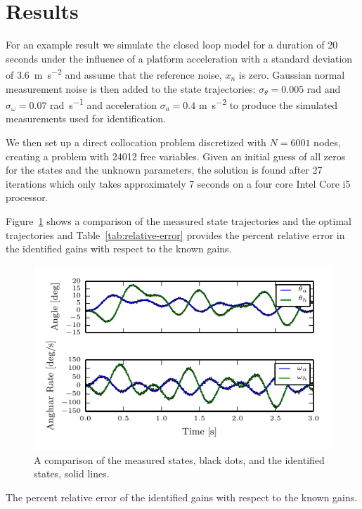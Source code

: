 \documentclass[11pt,a4paper,twocolumn]{article}
\begin{document}
\section*{Results}

For an example result we simulate the closed loop model for a duration of 20
seconds under the influence of a platform acceleration with a standard
deviation of 3.6~\si{\meter\per\second\squared} and assume that the reference
noise, $x_n$ is zero. Gaussian normal measurement noise is then added to the
state trajectories: $\sigma_\theta=0.005$ \si{\radian} and $\sigma_\omega=0.07$
\si{\radian\per\second} and acceleration $\sigma_a=0.4$
\si{\meter\per\second\squared} to produce the simulated measurements used for
identification.

We then set up a direct collocation problem discretized with $N=6001$ nodes,
creating a problem with 24012 free variables. Given an initial guess of all
zeros for the states and the unknown parameters, the solution is found after 27
iterations which only takes approximately 7 seconds on a four core Intel Core
i5 processor.

Figure~\ref{fig:trajectory-comparison} shows a comparison of the measured state
trajectories and the optimal trajectories and Table~\ref{tab:relative-error}
provides the percent relative error in the identified gains with respect to the
known gains.
%
\begin{figure}
  \centering
  \includegraphics[width=\columnwidth]{figures/trajectory-comparison.pdf}
  \caption{A comparison of the measured states, black dots, and the identified
    states, solid lines.}
  \label{fig:trajectory-comparison}
\end{figure}
%
\begin{table}
  \centering
  \caption{The percent relative error of the identified gains with respect to
    the known gains.}
  
  \label{tab:relative-error}
\end{table}
\end{document}
